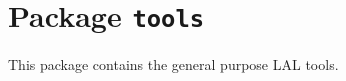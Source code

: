 \chapter{Package \texttt{tools}}

This package contains the general purpose LAL tools.

\newpage
\newpage

\newpage\begin{thebibliography}{0}




\end{thebibliography}
